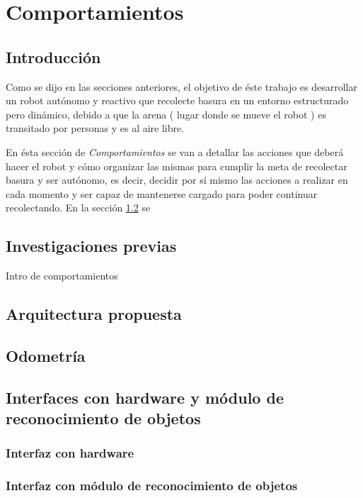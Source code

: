\section{Comportamientos}

\subsection{Introducci\'on}
Como se dijo en las secciones anteriores, el objetivo de \'este trabajo
es desarrollar un robot aut\'onomo y reactivo que recolecte basura en un entorno
estructurado pero din\'amico, debido a que la arena ( lugar donde se mueve el robot )
es transitado por personas y es al aire libre.

En \'esta secci\'on de \emph{Comportamientos} se van
a detallar las acciones que deber\'a hacer el robot y c\'omo organizar las mismas
para cumplir la meta de recolectar basura y ser aut\'onomo, es decir, decidir por
s\'i mismo las acciones a realizar en cada momento y ser capaz de mantenerse cargado
para poder continuar recolectando. En la secci\'on \ref{inv_prev} se

\subsection{Investigaciones previas}
\label{inv_prev}
Intro de comportamientos

\subsection{Arquitectura propuesta}
\label{arq_prop}



\subsection{Odometr\'ia}
\label{odometry}

\subsection{Interfaces con hardware y m\'odulo de reconocimiento de objetos}
\label{interfaces}

\subsubsection{Interfaz con hardware}

\subsubsection{Interfaz con m\'odulo de reconocimiento de objetos}

